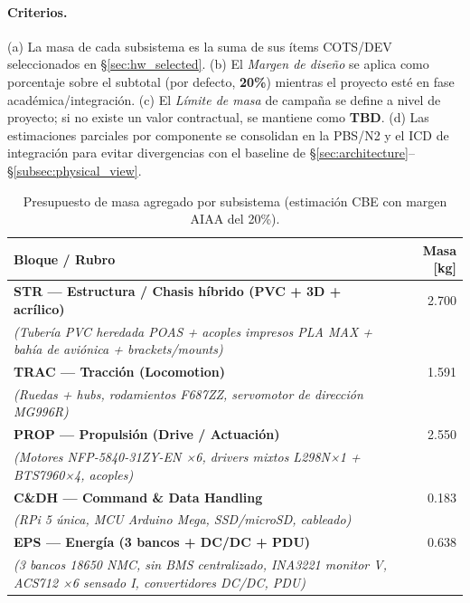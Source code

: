 \paragraph{Criterios.}
(a) La masa de cada subsistema es la suma de sus ítems COTS/DEV seleccionados en §\ref{sec:hw_selected}. (b) El \emph{Margen de diseño} se aplica como porcentaje sobre el subtotal (por defecto, \textbf{20\%}) mientras el proyecto esté en fase académica/integración. (c) El \emph{Límite de masa} de campaña se define a nivel de proyecto; si no existe un valor contractual, se mantiene como \textbf{TBD}. (d) Las estimaciones parciales por componente se consolidan en la PBS/N2 y el ICD de integración para evitar divergencias con el baseline de §\ref{sec:architecture}–§\ref{subsec:physical_view}. \cite{nasa_cm, segoldmine_ppi}

\begin{table}[H]
\centering
\caption{Presupuesto de masa agregado por subsistema (estimación CBE con margen AIAA del 20\%).}
\renewcommand{\arraystretch}{1.20}
\begin{tabular}{p{7.5cm} r}
\hline
\textbf{Bloque / Rubro} & \textbf{Masa [kg]} \\
\hline
\textbf{STR — Estructura / Chasis híbrido (PVC + 3D + acrílico)} & 2.700 \\
\textit{(Tubería PVC heredada POAS + acoples impresos PLA MAX + bahía de aviónica + brackets/mounts)} & \\[1ex]

\textbf{TRAC — Tracción (Locomotion)} & 1.591 \\
\textit{(Ruedas + hubs, rodamientos F687ZZ, servomotor de dirección MG996R)} & \\[1ex]

\textbf{PROP — Propulsión (Drive / Actuación)} & 2.550 \\
\textit{(Motores NFP-5840-31ZY-EN ×6, drivers mixtos L298N×1 + BTS7960×4, acoples)} & \\[1ex]

\textbf{C\&DH — Command \& Data Handling} & 0.183 \\
\textit{(RPi 5 única, MCU Arduino Mega, SSD/microSD, cableado)} & \\[1ex]

\textbf{EPS — Energía (3 bancos + DC/DC + PDU)} & 0.638 \\
\textit{(3 bancos 18650 NMC, sin BMS centralizado, INA3221 monitor V, ACS712 ×6 sensado I, convertidores DC/DC, PDU)} & \\[1ex]


\end{tabular}
\end{table}
